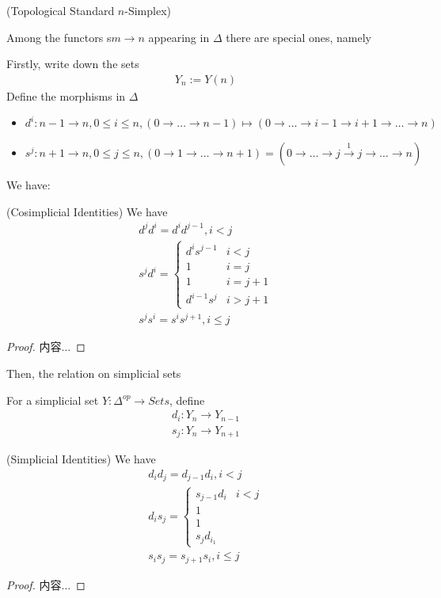 \documentclass[Total.tex]{subfiles}
\begin{document}
			\begin{example}
				(Topological Standard $n$-Simplex) 
			\end{example}
			Among the functors s$m\rightarrow n$ appearing in $\Delta$ there are special ones, namely
			\begin{Def}
				Firstly, write down the sets 
				\begin{gather*}
					Y_n:=Y(n)
				\end{gather*}
				 Define the morphisms in $\Delta$
				\begin{itemize}
					\item $d^i:n-1\rightarrow n,0\leq i\leq n,(0\rightarrow\dots\rightarrow n-1)\mapsto (0\rightarrow \dots\rightarrow i-1\rightarrow i+1\rightarrow \dots\rightarrow n)$
					\item $s^j:n+1\rightarrow n,0\leq j\leq n,(0\rightarrow 1\rightarrow\dots \rightarrow n+1)=(0\rightarrow \dots\rightarrow j\stackrel{1}{\rightarrow} j\rightarrow \dots\rightarrow n)$
				\end{itemize}
			\end{Def}
			We have:
			\begin{proposition}
				(Cosimplicial Identities) We have
				\begin{gather*}
					d^jd^i=d^id^{j-1},i<j\\
					s^jd^i=\begin{cases}
						d^is^{j-1}&i<j\\
						1&i=j\\
						1&i=j+1\\
						d^{i-1}s^j&i>j+1
					\end{cases}\\
					s^js^i=s^is^{j+1},i\leq j
				\end{gather*}
			\end{proposition}
			\begin{proof}
				内容...
			\end{proof}
			Then, the relation on simplicial sets
			\begin{Def}
				For a simplicial set $Y:\Delta^{op}\rightarrow Sets$, define
				\begin{gather*}
					d_i:Y_n\rightarrow Y_{n-1}\\
					s_j:Y_n\rightarrow Y_{n+1}
				\end{gather*}
			\end{Def}
			\begin{proposition}
				(Simplicial Identities) We have
				\begin{gather*}
					d_i d_j=d_{j-1}d_i,i<j\\
					d_is_j=\begin{cases}
						s_{j-1}d_i&i<j\\
						1&\\
						1&\\
						s_j d_{i_1}
					\end{cases}\\
					s_is_j=s_{j+1}s_i,i\leq j
				\end{gather*}
			\end{proposition}
			\begin{proof}
				内容...
			\end{proof}
\end{document}
